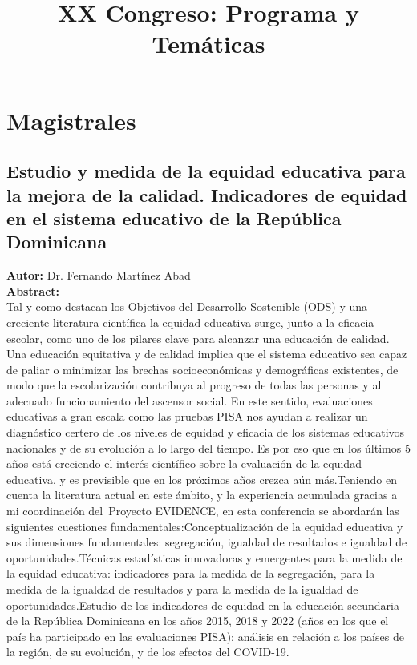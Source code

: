 \documentclass[11pt,a4paper]{article}
\title{XX Congreso: Programa y Temáticas}
\author{}
\date{}
\begin{document}
\maketitle
\tableofcontents
\newpage

\section{Magistrales}

\subsection{Estudio y medida de la equidad educativa para la mejora de la calidad. Indicadores de equidad en el sistema educativo de la República Dominicana}


\noindent \textbf{Autor:} Dr. Fernando Martínez Abad \\

\noindent \textbf{Abstract:} \\

Tal y como destacan los Objetivos del Desarrollo Sostenible (ODS) y una creciente literatura científica la equidad educativa surge, junto a la eficacia escolar, como uno de los pilares clave para alcanzar una educación de calidad. Una educación equitativa y de calidad implica que el sistema educativo sea capaz de paliar o minimizar las brechas socioeconómicas y demográficas existentes, de modo que la escolarización contribuya al progreso de todas las personas y al adecuado funcionamiento del ascensor social. En este sentido, evaluaciones educativas a gran escala como las pruebas PISA nos ayudan a realizar un diagnóstico certero de los niveles de equidad y eficacia de los sistemas educativos nacionales y de su evolución a lo largo del tiempo. Es por eso que en los últimos 5 años está creciendo el interés científico sobre la evaluación de la equidad educativa, y es previsible que en los próximos años crezca aún más.Teniendo en cuenta la literatura actual en este ámbito, y la experiencia acumulada gracias a mi coordinación del Proyecto EVIDENCE, en esta conferencia se abordarán las siguientes cuestiones fundamentales:Conceptualización de la equidad educativa y sus dimensiones fundamentales: segregación, igualdad de resultados e igualdad de oportunidades.Técnicas estadísticas innovadoras y emergentes para la medida de la equidad educativa: indicadores para la medida de la segregación, para la medida de la igualdad de resultados y para la medida de la igualdad de oportunidades.Estudio de los indicadores de equidad en la educación secundaria de la República Dominicana en los años 2015, 2018 y 2022 (años en los que el país ha participado en las evaluaciones PISA): análisis en relación a los países de la región, de su evolución, y de los efectos del COVID-19.
\end{document}
